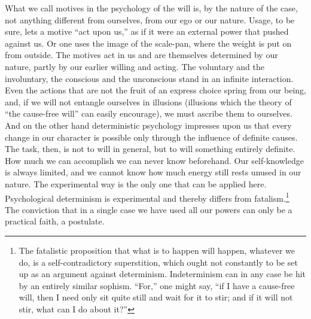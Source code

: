 \documentclass[12pt,a4paper]{book}
\newcommand{\opage}[1]{\marginnote{\footnotesize\textit{[#1]}}}
\begin{document}
What we call motives in the psychology of the will is, by the nature of
the case, not anything different from ourselves, from our ego or our
nature. Usage, to be sure, lets a motive ``act upon us,'' as if it were
an external power that pushed against us. Or one uses the image of the
scale-pan, where the weight is put on from outside. The motives act in us
and are themselves determined by our nature, partly by our earlier willing
and acting. The voluntary and the involuntary, the conscious and the
unconscious stand in an infinite interaction. Even the actions that are
not the fruit of an express choice spring from our being, and, if we will
not entangle ourselves in illusions (illusions which the theory of ``the
cause-free will'' can easily encourage), we must ascribe them to
ourselves. And on the other hand deterministic psychology impresses upon
us that every change in our character is possible only through the
influence of definite causes. The task, then, is not to will in general,
but to will something entirely definite. How much we can accomplish we can
never know beforehand. Our self-knowledge is always limited, and we cannot
know how much energy still rests unused in our nature. The experimental way
is the only one that can be applied here. Psychological determinism is
experimental and thereby differs from fatalism.\footnote{The fatalistic
proposition that what is to happen will happen, whatever we do, is a
self-contradictory superstition, which ought not constantly to be set up
as an argument against determinism. Indeterminism can in any case be hit
by an entirely similar sophism. ``For,'' one might say, ``if I have a
cause-free will, then I need only sit quite still and wait for it to
stir; and if it will not stir, what can I do about it?''}
\opage{402}The conviction that in a single case we have used all our
powers can only be a practical faith, a postulate.
\end{document}
